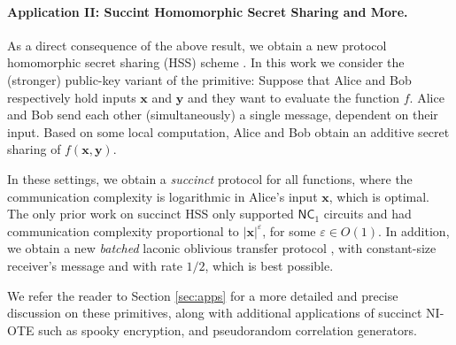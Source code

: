 \documentclass{article}
\begin{document}
\paragraph{Application II: Succint Homomorphic Secret Sharing and More.}
As a direct consequence of the above result, we obtain a new protocol homomorphic secret sharing (HSS) scheme \cite{C:BoyGilIsh16}. {In this work we consider the (stronger) public-key variant of the primitive: Suppose that Alice and Bob respectively hold inputs $\mathbf{x}$ and $\mathbf{y}$ and they want to evaluate the function $f$. Alice and Bob send each other (simultaneously) a single message, dependent on their input. Based on some local computation, Alice and Bob obtain an additive secret sharing of $f(\mathbf{x}, \mathbf{y})$.}

{In these settings, we obtain a \emph{succinct} \cite{EC:AbrRoySch24} protocol for all functions, where the communication complexity is logarithmic in Alice's input} $\mathbf{x}$, which is optimal. The only prior work on succinct HSS \cite{EC:AbrRoySch24} only supported $\mathsf{NC}_1$ circuits and had communication complexity proportional to $\lvert \mathbf{x}\rvert^\varepsilon$, for some $\varepsilon\in O(1)$. In addition, we obtain a new \emph{batched} laconic oblivious transfer protocol \cite{C:CDGGMP17}, with constant-size receiver's message and with rate $1/2$, which is best possible. 

We refer the reader to Section \ref{sec:apps} for a more detailed and precise discussion on these primitives, along with additional applications of succinct NI-OTE such as spooky encryption, and pseudorandom correlation generators.
\end{document}
